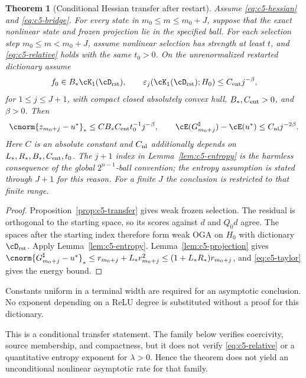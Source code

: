 \documentclass[11pt]{article}
\newtheorem{theorem}{Theorem}[section]
\theoremstyle{remark}
\begin{document}
\begin{theorem}[Conditional Hessian transfer after restart]
\label{thm:c5-hessian}
Assume \eqref{eq:c5-hessian} and \eqref{eq:c5-bridge}.
For every state in $m_0\leq m\leq m_0+J$, suppose that the exact nonlinear
state and frozen projection lie in the specified ball.
For each selection step $m_0\leq m<m_0+J$, assume nonlinear selection
has strength at least $t$, and \eqref{eq:c5-relative} holds with
the same $t_0>0$. On the unrenormalized restarted dictionary assume
\begin{equation}
 f_0\in B_*\cK_1(\cD_{\rm rst}),\qquad
 \varepsilon_j(\cK_1(\cD_{\rm rst});H_0)\leq C_{\rm ent}j^{-\beta},
 \label{eq:c5-source-entropy}
\end{equation}
for $1\leq j\leq J+1$, with compact closed absolutely convex hull,
$B_*,C_{\rm ent}>0$, and $\beta>0$.
Then
\[
 \cnorm{z_{m_0+j}-u^*}_*\leq
 C B_*C_{\rm ent}t_0^{-1}j^{-\beta},\qquad
 \cE(G_{m_0+j}^\sharp)-\cE(u^*)\leq C_{\rm nl}j^{-2\beta}.
\]
Here $C$ is an absolute constant and $C_{\rm nl}$ additionally depends
on $L_*,R_*,B_*,C_{\rm ent},t_0$. The \(j+1\) index in
Lemma~\ref{lem:c5-entropy} is the harmless consequence of the global
\(2^{n-1}\)-ball convention; the entropy assumption is stated through
\(J+1\) for this reason. For a finite $J$ the conclusion is restricted to
that finite range.
\end{theorem}
\begin{proof}
Proposition~\ref{prop:c5-transfer} gives weak frozen selection.
The residual is orthogonal to the starting space, so its scores against
$d$ and $Q_0d$ agree. The spaces after the starting index therefore form weak OGA
on $H_0$ with dictionary $\cD_{\rm rst}$. Apply
Lemma~\ref{lem:c5-entropy}. Lemma~\ref{lem:c5-projection} gives
$\cnorm{G_{m_0+j}^\sharp-u^*}_*
\leq r_{m_0+j}+L_*r_{m_0+j}^2
\leq(1+L_*R_*)r_{m_0+j}$, and \eqref{eq:c5-taylor}
gives the energy bound.
\end{proof}
Constants uniform in a terminal width are required for an asymptotic
conclusion. No exponent depending on a ReLU degree is substituted
without a proof for this dictionary.

This is a conditional transfer statement. The family below verifies
coercivity, source membership, and compactness, but it does not verify
\eqref{eq:c5-relative} or a quantitative entropy exponent for
\(\lambda>0\). Hence the theorem does not yield an unconditional nonlinear
asymptotic rate for that family.
\end{document}
